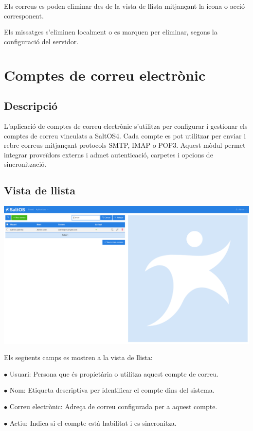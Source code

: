\documentclass[a4paper]{article}
\begin{document}
Els correus es poden eliminar des de la vista de llista mitjançant la icona o acció corresponent.

Els missatges s’eliminen localment o es marquen per eliminar, segons la configuració del servidor.


\hypertarget{toc96}{}
\section{Comptes de correu electrònic}

\hypertarget{toc97}{}
\subsection{Descripció}

L'aplicació de comptes de correu electrònic s'utilitza per configurar i gestionar els comptes de correu vinculats a SaltOS4.
Cada compte es pot utilitzar per enviar i rebre correus mitjançant protocols SMTP, IMAP o POP3.
Aquest mòdul permet integrar proveïdors externs i admet autenticació, carpetes i opcions de sincronització.

\hypertarget{toc98}{}
\subsection{Vista de llista}

\begin{center}\includegraphics[width=1\textwidth]{../ujest/snaps/test-screenshots-js-screenshots-emails-emails-accounts-list-ca-es-1-snap.png}\end{center}

Els següents camps es mostren a la vista de llista:

\begin{compactitem}
\item[\color{myblue}$\bullet$] Usuari: Persona que és propietària o utilitza aquest compte de correu.
\item[\color{myblue}$\bullet$] Nom: Etiqueta descriptiva per identificar el compte dins del sistema.
\item[\color{myblue}$\bullet$] Correu electrònic: Adreça de correu configurada per a aquest compte.
\item[\color{myblue}$\bullet$] Actiu: Indica si el compte està habilitat i es sincronitza.
\end{compactitem}
\end{document}
